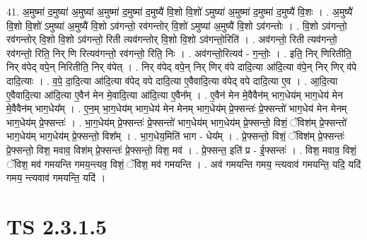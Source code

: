 \documentclass[17pt]{extarticle}
\begin{document}
41. अ॒मुष्मा॑ द॒मुष्या॑ अ॒मुष्या॑ अ॒मुष्मा॑ द॒मुष्मा॑ द॒मुष्यै॑ वि॒शो वि॒शो॑ ऽमुष्या॑ अ॒मुष्मा॑ द॒मुष्मा॑ द॒मुष्यै॑ वि॒शः । . अ॒मुष्यै॑ वि॒शो वि॒शो॑ ऽमुष्या॑ अ॒मुष्यै॑ वि॒शो ऽव॑गन्तो॒ रव॑गन्तोर् वि॒शो॑ ऽमुष्या॑ अ॒मुष्यै॑ वि॒शो ऽव॑गन्तोः । . वि॒शो ऽव॑गन्तो॒ रव॑गन्तोर् वि॒शो वि॒शो ऽव॑गन्तो॒ रिती त्यव॑गन्तोर् वि॒शो वि॒शो ऽव॑गन्तो॒रिति॑ । . अव॑गन्तो॒ रिती त्यव॑गन्तो॒ रव॑गन्तो॒ रिति॒ निर् णि रित्यव॑गन्तो॒ रव॑गन्तो॒ रिति॒ निः । . अव॑गन्तो॒रित्यव॑ - ग॒न्तोः॒ । . इति॒ निर् णिरितीति॒ निर् व॑पेद् वपे॒न् निरितीति॒ निर् व॑पेत् । . निर् व॑पेद् वपे॒न् निर् णिर् व॑पे दादि॒त्या आ॑दि॒त्या व॑पे॒न् निर् णिर् व॑पे दादि॒त्याः । . व॒पे॒ दा॒दि॒त्या आ॑दि॒त्या व॑पेद् वपे दादि॒त्या ए॒वैवादि॒त्या व॑पेद् वपे दादि॒त्या ए॒व । . आ॒दि॒त्या ए॒वैवादि॒त्या आ॑दि॒त्या ए॒वैन॑ मेन मे॒वादि॒त्या आ॑दि॒त्या ए॒वैन᳚म् । . ए॒वैन॑ मेन मे॒वैवैन॑म् भाग॒धेय॑म् भाग॒धेय॑ मेन मे॒वैवैन॑म् भाग॒धेय᳚म् । . ए॒न॒म् भा॒ग॒धेय॑म् भाग॒धेय॑ मेन मेनम् भाग॒धेय॑म् प्रे॒फ्सन्तः॑ प्रे॒फ्सन्तो॑ भाग॒धेय॑ मेन मेनम् भाग॒धेय॑म् प्रे॒फ्सन्तः॑ । . भा॒ग॒धेय॑म् प्रे॒फ्सन्तः॑ प्रे॒फ्सन्तो॑ भाग॒धेय॑म् भाग॒धेय॑म् प्रे॒फ्सन्तो॒ विशं॒ ॅविश॑म् प्रे॒फ्सन्तो॑ भाग॒धेय॑म् भाग॒धेय॑म् प्रे॒फ्सन्तो॒ विश᳚म् । . भा॒ग॒धेय॒मिति॑ भाग - धेय᳚म् । . प्रे॒फ्सन्तो॒ विशं॒ ॅविश॑म् प्रे॒फ्सन्तः॑ प्रे॒फ्सन्तो॒ विश॒ मवाव॒ विश॑म् प्रे॒फ्सन्तः॑ प्रे॒फ्सन्तो॒ विश॒ मव॑ । . प्रे॒फ्सन्त॒ इति॑ प्र - ई॒फ्सन्तः॑ । . विश॒ मवाव॒ विशं॒ ॅविश॒ मव॑ गमयन्ति गमय॒न्त्यव॒ विशं॒ ॅविश॒ मव॑ गमयन्ति । . अव॑ गमयन्ति गमय॒ न्त्यवाव॑ गमयन्ति॒ यदि॒ यदि॑ गमय॒ न्त्यवाव॑ गमयन्ति॒ यदि॑ । \newline
\pagebreak
{}

\section{ TS 2.3.1.5 }
\end{document}
